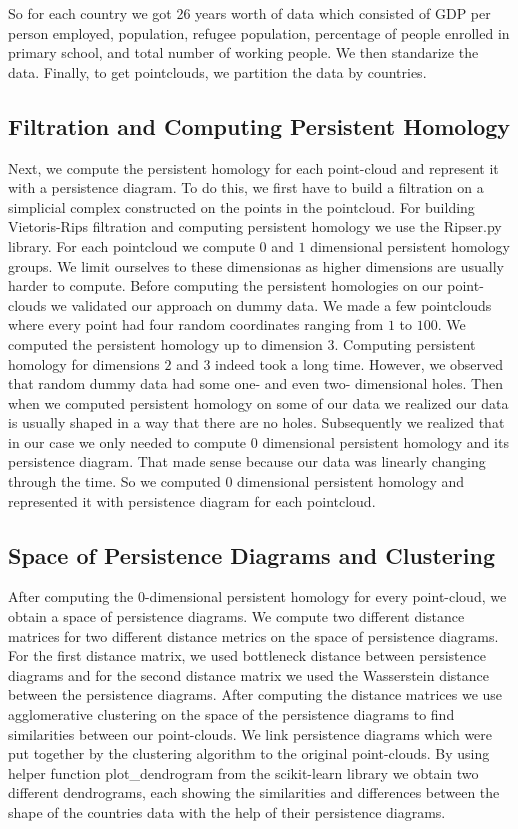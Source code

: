 \documentclass[12pt]{article}
\begin{document}
So for each country we got 26 years worth of data which consisted of GDP per person employed, population, refugee population, percentage of people enrolled in primary school, and total number of working people. We then standarize the data. Finally, to get pointclouds, we partition the data by countries. 

\subsection{Filtration and Computing Persistent Homology}
Next, we compute the persistent homology for each point-cloud and represent it with a persistence diagram. To do this, we first have to build a filtration on a simplicial complex constructed on the points in the pointcloud. For building Vietoris-Rips filtration and computing persistent homology we use the Ripser.py library. For each pointcloud we compute $0$ and $1$ dimensional persistent homology groups. We limit ourselves to these dimensionas as higher dimensions are usually harder to compute. Before computing the persistent homologies on our point-clouds we validated our approach on dummy data. We made a few pointclouds where every point had four random coordinates ranging from $1$ to $100$. We computed the persistent homology up to dimension $3$. Computing persistent homology for dimensions $2$ and $3$ indeed took a long time. However, we observed that random dummy data had some one- and even two- dimensional holes. Then when we computed persistent homology on some of our data we realized our data is usually shaped in a way that there are no holes. Subsequently we realized that in our case we only needed to compute $0$ dimensional persistent homology and its persistence diagram. That made sense because our data was linearly changing through the time. So we computed 0 dimensional persistent homology and  represented it with persistence diagram for each pointcloud. 

\subsection{Space of Persistence Diagrams and Clustering}
After computing the $0$-dimensional persistent homology for every point-cloud, we obtain a space of persistence diagrams. We compute two different distance matrices for two different distance metrics on the space of persistence diagrams. For the first distance matrix, we used bottleneck distance between persistence diagrams and for the second distance matrix we used the Wasserstein distance between the persistence diagrams. After computing the distance matrices we use agglomerative clustering on the space of the persistence diagrams to find similarities between our point-clouds. We link persistence diagrams which were put together by the clustering algorithm to the original point-clouds. By using helper function plot\_dendrogram from the scikit-learn library we obtain two different dendrograms, each showing the similarities and differences between the shape of the countries data with the help of their persistence diagrams.
\end{document}
